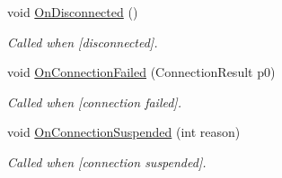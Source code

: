 \begin{DoxyCompactItemize}
\item 
void \hyperlink{class_w_c_c_mobile_1_1_campus_map_activity_a406a3e9490fd2a158b1b2c65f7c99448}{On\+Disconnected} ()
\begin{DoxyCompactList}\small\item\em Called when \mbox{[}disconnected\mbox{]}. \end{DoxyCompactList}\item 
void \hyperlink{class_w_c_c_mobile_1_1_campus_map_activity_ab8134e37f2c53584ae6d5425876e04e8}{On\+Connection\+Failed} (Connection\+Result p0)
\begin{DoxyCompactList}\small\item\em Called when \mbox{[}connection failed\mbox{]}. \end{DoxyCompactList}\item 
void \hyperlink{class_w_c_c_mobile_1_1_campus_map_activity_a37c8fdd89fae802e8b02b3e1e3fd25d0}{On\+Connection\+Suspended} (int reason)
\begin{DoxyCompactList}\small\item\em Called when \mbox{[}connection suspended\mbox{]}. \end{DoxyCompactList}\end{DoxyCompactItemize}
